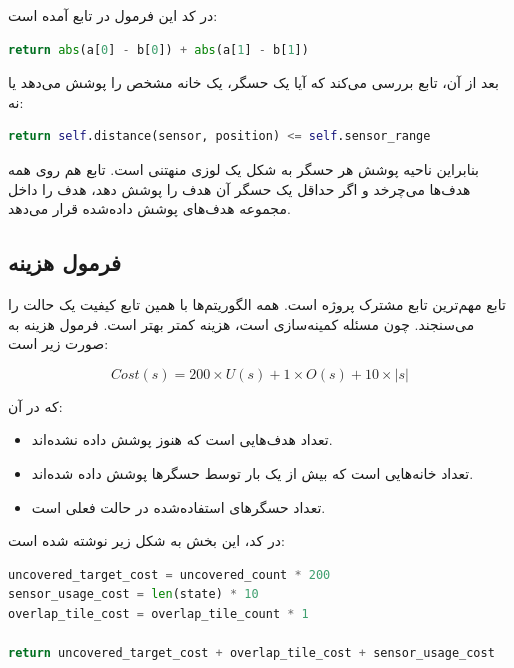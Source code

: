 \documentclass[10.5pt]{exam}
\begin{document}
در کد این فرمول در تابع
آمده است:

\begin{latin}
\begin{lstlisting}[language=Python]
return abs(a[0] - b[0]) + abs(a[1] - b[1])
\end{lstlisting}
\end{latin}

بعد از آن، تابع
بررسی می‌کند که آیا یک حسگر، یک خانه مشخص را پوشش می‌دهد یا نه:

\begin{latin}
\begin{lstlisting}[language=Python]
return self.distance(sensor, position) <= self.sensor_range
\end{lstlisting}
\end{latin}

بنابراین ناحیه پوشش هر حسگر به شکل یک لوزی منهتنی است. تابع
هم روی همه هدف‌ها می‌چرخد و اگر حداقل یک حسگر آن هدف را پوشش دهد، هدف را داخل مجموعه هدف‌های پوشش داده‌شده قرار می‌دهد.

\subsection{فرمول هزینه}
تابع
مهم‌ترین تابع مشترک پروژه است. همه الگوریتم‌ها با همین تابع کیفیت یک حالت را می‌سنجند. چون مسئله کمینه‌سازی است، هزینه کمتر بهتر است. فرمول هزینه به صورت زیر است:

\[
    Cost(s) =
    200 \times U(s) + 1 \times O(s) + 10 \times |s|
\]

که در آن:

\begin{itemize}
    \item {} تعداد هدف‌هایی است که هنوز پوشش داده نشده‌اند.
    \item {} تعداد خانه‌هایی است که بیش از یک بار توسط حسگرها پوشش داده شده‌اند.
    \item {} تعداد حسگرهای استفاده‌شده در حالت فعلی است.
\end{itemize}

در کد، این بخش به شکل زیر نوشته شده است:

\begin{latin}
\begin{lstlisting}[language=Python]
uncovered_target_cost = uncovered_count * 200
sensor_usage_cost = len(state) * 10
overlap_tile_cost = overlap_tile_count * 1

return uncovered_target_cost + overlap_tile_cost + sensor_usage_cost
\end{lstlisting}
\end{latin}
\end{document}
